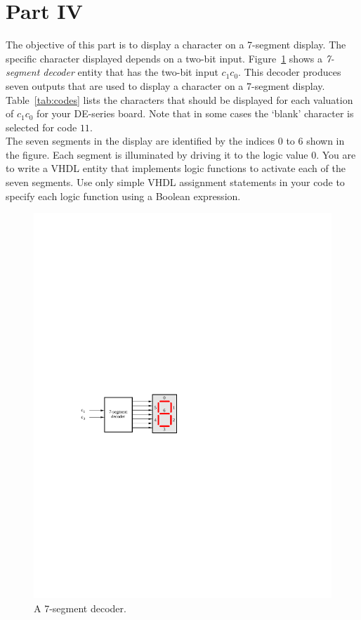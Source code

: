\documentclass[epsfig,10pt,fullpage]{article}
\begin{document}
\section*{Part IV}
The objective of this part is to display a character on a 7-segment display.
The specific character displayed depends on a two-bit input.
Figure~\ref{fig:6} shows a {\it 7-segment decoder} entity that has the two-bit input $c_1
c_0$. This decoder produces seven outputs that are used to display a character on a
7-segment display. Table~\ref{tab:codes} lists the characters that should be displayed for each
valuation of $c_1 c_0$ for your DE-series board. Note that in some cases the `blank' 
character is selected for code $11$.
~\\

The seven segments in the display are identified by the indices 0 to 6 shown in the
figure. Each segment is illuminated by driving it to the logic value 0. You are to write a
VHDL entity that implements logic functions to activate
each of the seven segments.
Use only simple VHDL assignment statements in your code to specify each logic function using a
Boolean expression. 

\begin{figure}[H]
	\begin{center}
		\includegraphics[]{figures/figure6.pdf}
	\end{center}
\caption{A 7-segment decoder.}
\label{fig:6}
\end{figure}
\end{document}
